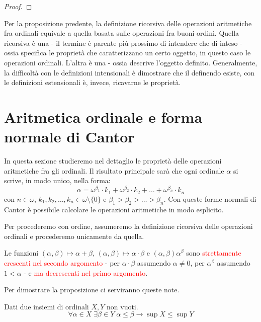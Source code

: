 \documentclass[11pt]{scrartcl}
\begin{document}
\begin{proof}
	
\end{proof}

Per la proposizione predente, la definizione ricorsiva delle operazioni aritmetiche fra ordinali equivale a quella basata sulle operazioni fra buoni ordini. Quella ricorsiva è una  - il termine 
è parente più prossimo di intendere che di inteso - ossia specifica le proprietà che caratterizzano un certo oggetto, in questo caso le operazioni ordinali. L'altra è una  -
ossia descrive l'oggetto definito. Generalmente, la difficoltà con le definizioni intensionali è dimostrare che il definendo esiste, con le definizioni estensionali è, invece, ricavarne le proprietà.

\newpage
\section{Aritmetica ordinale e forma normale di Cantor}
In questa sezione studieremo nel dettaglio le proprietà delle operazioni aritmetiche fra gli ordinali. Il risultato principale sarà che ogni ordinale $\alpha$ si scrive, in modo unico, nella forma:
\[ \alpha = \omega^{\beta_1}\cdot k_1 + \omega^{\beta_2}\cdot k_2 + \ldots + \omega^{\beta_n}\cdot k_n
	\]
con $n \in \omega$, $k_1,k_2,\ldots,k_n \in \omega\setminus\{0\}$ e $\beta_1 > \beta_2 > \ldots > \beta_n$. Con queste forme normali di Cantor è possibile calcolare le operazioni aritmetiche in modo esplicito.

\begin{note}
	Per procederemo con ordine, assumeremo la definizione ricorsiva delle operazioni ordinali e procederemo unicamente da quella.
\end{note}

\begin{proposition}
	Le funzioni $(\alpha,\beta)\mapsto \alpha + \beta$, $(\alpha,\beta) \mapsto \alpha \cdot \beta$ e $(\alpha,\beta) \alpha^\beta$ sono \textcolor{red}{strettamente crescenti nel secondo argomento} - per $\alpha \cdot \beta$ assumendo $\alpha \ne 0$,
	per $\alpha^\beta$ assumendo $1<\alpha$ - e \textcolor{red}{ma decrescenti nel primo argomento}.
\end{proposition}

Per dimostrare la proposizione ci serviranno queste note.

\begin{note}
	Dati due insiemi di ordinali $X,Y$ non vuoti.
\[ \forall \alpha \in X \; \exists \beta \in Y \; \alpha \leq \beta \rightarrow \sup X \leq \sup Y
	\]
\end{note}
\end{document}
